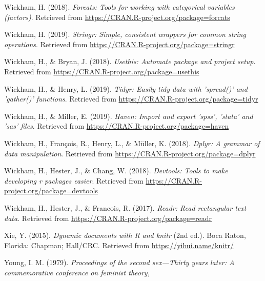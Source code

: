 \documentclass[man]{apa6}
\begin{document}
\hypertarget{ref-R-forcats}{}
Wickham, H. (2018). \emph{Forcats: Tools for working with categorical
variables (factors)}. Retrieved from
\url{https://CRAN.R-project.org/package=forcats}

\hypertarget{ref-R-stringr}{}
Wickham, H. (2019). \emph{Stringr: Simple, consistent wrappers for
common string operations}. Retrieved from
\url{https://CRAN.R-project.org/package=stringr}

\hypertarget{ref-R-usethis}{}
Wickham, H., \& Bryan, J. (2018). \emph{Usethis: Automate package and
project setup}. Retrieved from
\url{https://CRAN.R-project.org/package=usethis}

\hypertarget{ref-R-tidyr}{}
Wickham, H., \& Henry, L. (2019). \emph{Tidyr: Easily tidy data with
'spread()' and 'gather()' functions}. Retrieved from
\url{https://CRAN.R-project.org/package=tidyr}

\hypertarget{ref-R-haven}{}
Wickham, H., \& Miller, E. (2019). \emph{Haven: Import and export
'spss', 'stata' and 'sas' files}. Retrieved from
\url{https://CRAN.R-project.org/package=haven}

\hypertarget{ref-R-dplyr}{}
Wickham, H., François, R., Henry, L., \& Müller, K. (2018). \emph{Dplyr:
A grammar of data manipulation}. Retrieved from
\url{https://CRAN.R-project.org/package=dplyr}

\hypertarget{ref-R-devtools}{}
Wickham, H., Hester, J., \& Chang, W. (2018). \emph{Devtools: Tools to
make developing r packages easier}. Retrieved from
\url{https://CRAN.R-project.org/package=devtools}

\hypertarget{ref-R-readr}{}
Wickham, H., Hester, J., \& Francois, R. (2017). \emph{Readr: Read
rectangular text data}. Retrieved from
\url{https://CRAN.R-project.org/package=readr}

\hypertarget{ref-R-knitr}{}
Xie, Y. (2015). \emph{Dynamic documents with R and knitr} (2nd ed.).
Boca Raton, Florida: Chapman; Hall/CRC. Retrieved from
\url{https://yihui.name/knitr/}

\hypertarget{ref-young1979}{}
Young, I. M. (1979). \emph{Proceedings of the second sex---Thirty years
later: A commemorative conference on feminist theory,}

\endgroup
\end{document}
